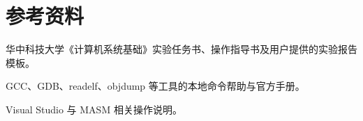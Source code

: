 \section*{参考资料}

\begin{enumerate}[label={{[\arabic*]}}]
    \item 华中科技大学《计算机系统基础》实验任务书、操作指导书及用户提供的实验报告模板。
    \item GCC、GDB、readelf、objdump 等工具的本地命令帮助与官方手册。
    \item Visual Studio 与 MASM 相关操作说明。
\end{enumerate}
